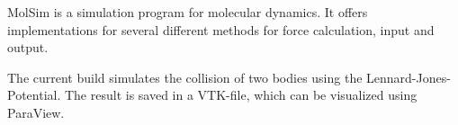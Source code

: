 Mol\-Sim is a simulation program for molecular dynamics. It offers implementations for several different methods for force calculation, input and output.

The current build simulates the collision of two bodies using the Lennard-\/\-Jones-\/\-Potential. The result is saved in a V\-T\-K-\/file, which can be visualized using Para\-View. 